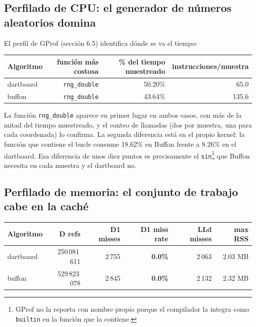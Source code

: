 \subsection{Perfilado de CPU: el generador de números aleatorios domina}

El perfil de GProf (sección 6.5) identifica dónde se va el tiempo:

\begin{center}
\small
\begin{tabular}{|l|r|r|r|}
\hline
\textbf{Algoritmo} & \textbf{función más costosa} & \textbf{\% del tiempo muestreado} & \textbf{instrucciones/muestra} \\
\hline
dartboard & \texttt{rng\_double} & 50.20\% & 65.0 \\
buffon & \texttt{rng\_double} & 43.64\% & 135.6 \\
\hline
\end{tabular}
\caption{Perfil de CPU con GProf ($N = 10^9$).}
\label{tab:gprof}
\end{center}

La función \texttt{rng\_double} aparece en primer lugar en ambos casos, con más de la mitad del tiempo muestreado, y el conteo de llamadas (dos por muestra, una para cada coordenada) lo confirma. La segunda diferencia está en el propio kernel: la función que contiene el bucle consume 18.62\% en Buffon frente a 8.26\% en el dartboard. Esa diferencia de unos diez puntos es precisamente el \texttt{sin}\footnote{GProf no la reporta con nombre propio porque el compilador la integra como \texttt{builtin} en la función que la contiene.} que Buffon necesita en cada muestra y el dartboard no.

\subsection{Perfilado de memoria: el conjunto de trabajo cabe en la caché}

\begin{center}
\small
\begin{tabular}{|l|r|r|r|r|r|}
\hline
\textbf{Algoritmo} & \textbf{D refs} & \textbf{D1 misses} & \textbf{D1 miss rate} & \textbf{LLd misses} & \textbf{max RSS} \\
\hline
dartboard & 250\,081\,611 & 2\,755 & \textbf{0.0\%} & 2\,063 & 2.03 MB \\
buffon & 529\,823\,078 & 2\,845 & \textbf{0.0\%} & 2\,132 & 2.32 MB \\
\hline
\end{tabular}
\caption{Perfilado de memoria con Cachegrind ($N = 10^7$).}
\label{tab:cachegrind}
\end{center}

